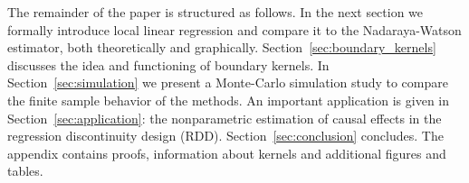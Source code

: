 The remainder of the paper is structured as follows.
In the next section we formally introduce local linear regression and compare it to the Nadaraya-Watson estimator,
both theoretically and graphically.
Section~\ref{sec:boundary_kernels} discusses the idea and functioning of boundary kernels.
In Section~\ref{sec:simulation} we present a Monte-Carlo simulation study to compare the finite sample behavior of the methods.
An important application is given in Section~\ref{sec:application}:
the nonparametric estimation of causal effects in the regression discontinuity design (RDD).
Section~\ref{sec:conclusion} concludes.
The appendix contains proofs, information about kernels and additional figures and tables.